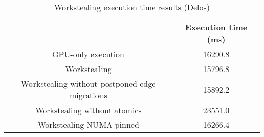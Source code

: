 \begin{table}[h!]
  \centering
  \begin{tabular}{||c | c||} 
   \hline
    & Execution time (ms) \\ [0.5ex] 
   \hline\hline
   GPU-only execution & 16290.8 \\
   Workstealing & 15796.8 \\ 
   Workstealing without postponed edge migrations & 15892.2 \\
   Workstealing without atomics & 23551.0 \\
   Workstealing NUMA pinned & 16266.4 \\ [1ex] 
   \hline
  \end{tabular}
  \caption{Workstealing execution time results (Delos)}
  \label{table:workst_delos}
\end{table}